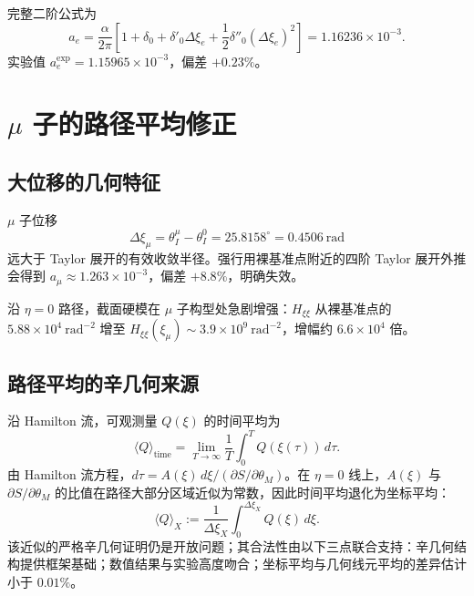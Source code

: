 \documentclass[12pt,a4paper]{article}
\theoremstyle{definition}
\begin{document}
完整二阶公式为
\begin{equation}
\boxed{a_e=\frac{\alpha}{2\pi}\left[1+\delta_0+\delta'_0\Delta\xi_e+\frac{1}{2}\delta''_0(\Delta\xi_e)^2\right]=1.16236\times10^{-3}.}
\end{equation}
实验值 $a_e^{\text{exp}}=1.15965\times10^{-3}$，偏差 $+0.23\%$。

\section{$\mu$ 子的路径平均修正}

\subsection{大位移的几何特征}

$\mu$ 子位移
\begin{equation}
\Delta\xi_\mu=\theta_I^\mu-\theta_I^0=25.8158^\circ=0.4506~\mathrm{rad}
\end{equation}
远大于 Taylor 展开的有效收敛半径。强行用裸基准点附近的四阶 Taylor 展开外推会得到 $a_\mu\approx1.263\times10^{-3}$，偏差 $+8.8\%$，明确失效。

沿 $\eta=0$ 路径，截面硬模在 $\mu$ 子构型处急剧增强：$H_{\xi\xi}$ 从裸基准点的 $5.88\times10^4~\mathrm{rad}^{-2}$ 增至 $H_{\xi\xi}(\xi_\mu)\sim3.9\times10^9~\mathrm{rad}^{-2}$，增幅约 $6.6\times10^4$ 倍。

\subsection{路径平均的辛几何来源}

沿 Hamilton 流，可观测量 $Q(\xi)$ 的时间平均为
\begin{equation}
\langle Q\rangle_{\text{time}}=\lim_{T\to\infty}\frac{1}{T}\int_0^T Q(\xi(\tau))\,d\tau.
\end{equation}
由 Hamilton 流方程，$d\tau=A(\xi)\,d\xi/(\partial S/\partial\theta_M)$。在 $\eta=0$ 线上，$A(\xi)$ 与 $\partial S/\partial\theta_M$ 的比值在路径大部分区域近似为常数，因此时间平均退化为坐标平均：
\begin{equation}
\boxed{\langle Q\rangle_X:=\frac{1}{\Delta\xi_X}\int_0^{\Delta\xi_X}Q(\xi)\,d\xi.}
\end{equation}
该近似的严格辛几何证明仍是开放问题；其合法性由以下三点联合支持：辛几何结构提供框架基础；数值结果与实验高度吻合；坐标平均与几何线元平均的差异估计小于 $0.01\%$。
\end{document}
